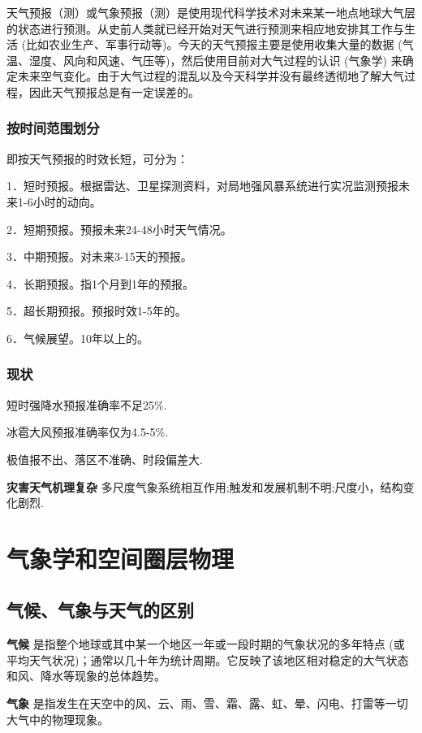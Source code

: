 \documentclass[12pt,a4paper]{article}
\begin{document}
	天气预报（测）或气象预报（测）是使用现代科学技术对未来某一地点地球大气层的状态进行预测。从史前人类就已经开始对天气进行预测来相应地安排其工作与生活 (比如农业生产、军事行动等)。今天的天气预报主要是使用收集大量的数据 (气温、湿度、风向和风速、气压等)，然后使用目前对大气过程的认识 (气象学) 来确定未来空气变化。由于大气过程的混乱以及今天科学并没有最终透彻地了解大气过程，因此天气预报总是有一定误差的。
	
	\subsubsection{按时间范围划分}
	即按天气预报的时效长短，可分为：
	
	1．短时预报。根据雷达、卫星探测资料，对局地强风暴系统进行实况监测预报未来1-6小时的动向。
	
	2．短期预报。预报未来24-48小时天气情况。
	
	3．中期预报。对未来3-15天的预报。
	
	4．长期预报。指1个月到1年的预报。
	
	5．超长期预报。预报时效1-5年的。
	
	6．气候展望。10年以上的。
	
	\subsubsection{现状}
	
	短时强降水预报准确率不足25\%.
	
	冰雹大风预报准确率仅为4.5-5\%.
	
	极值报不出、落区不准确、时段偏差大.
	
	\textbf{灾害天气机理复杂} 多尺度气象系统相互作用;触发和发展机制不明;尺度小，结构变化剧烈.
	
	\section{气象学和空间圈层物理}
	
	\subsection{气候、气象与天气的区别}
	
	\textbf{气候} 是指整个地球或其中某一个地区一年或一段时期的气象状况的多年特点 (或平均天气状况)；通常以几十年为统计周期。它反映了该地区相对稳定的大气状态和风、降水等现象的总体趋势。
	
	\textbf{气象} 是指发生在天空中的风、云、雨、雪、霜、露、虹、晕、闪电、打雷等一切大气中的物理现象。
	
\end{document}
